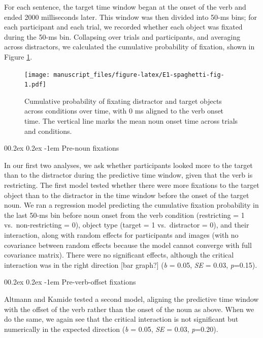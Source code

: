 \documentclass[
  man,floatsintext]{apa6}
\makeatletter
\let\oldparagraph\paragraph
\renewcommand{\paragraph}[1]{\oldparagraph{#1}\mbox{}}
\renewcommand{\paragraph}{\@startsection{paragraph}{4}{\parindent}%
  {0\baselineskip \@plus 0.2ex \@minus 0.2ex}%
  {-1em}%
  {\normalfont\normalsize\bfseries\itshape\typesectitle}}
\makeatother
\begin{document}
For each sentence, the target time window began at the onset of the verb and ended 2000 milliseconds later. This window was then divided into 50-ms bins; for each participant and each trial, we recorded whether each object was fixated during the 50-ms bin. Collapsing over trials and participants, and averaging across distractors, we calculated the cumulative probability of fixation, shown in Figure \ref{fig:E1-spaghetti-fig}.

\begin{figure}
\centering
\texttt{[image: manuscript\_files/figure-latex/E1-spaghetti-fig-1.pdf]}
\caption{\label{fig:E1-spaghetti-fig}Cumulative probability of fixating distractor and target objects across conditions over time, with 0 ms aligned to the verb onset time. The vertical line marks the mean noun onset time across trials and conditions.}
\end{figure}

\hypertarget{pre-noun-fixations}{%
\paragraph{Pre-noun fixations}\label{pre-noun-fixations}}

In our first two analyses, we ask whether participants looked more to the target than to the distractor during the predictive time window, given that the verb is restricting. The first model tested whether there were more fixations to the target object than to the distractor in the time window before the onset of the target noun. We ran a regression model predicting the cumulative fixation probability in the last 50-ms bin before noun onset from the verb condition (restricting = 1 vs.~non-restricting = 0), object type (target = 1 vs.~distractor = 0), and their interaction, along with random effects for participants and images (with no covariance between random effects because the model cannot converge with full covariance matrix). There were no significant effects, although the critical interaction was in the right direction {[}bar graph?{]} (\emph{b} = 0.05, \emph{SE} = 0.03, \emph{p}=0.15).

\hypertarget{pre-verb-offset-fixations}{%
\paragraph{Pre-verb-offset fixations}\label{pre-verb-offset-fixations}}

Altmann and Kamide tested a second model, aligning the predictive time window with the offset of the verb rather than the onset of the noun as above. When we do the same, we again see that the critical interaction is not significant but numerically in the expected direction (\emph{b} = 0.05, \emph{SE} = 0.03, \emph{p}=0.20).
\end{document}
